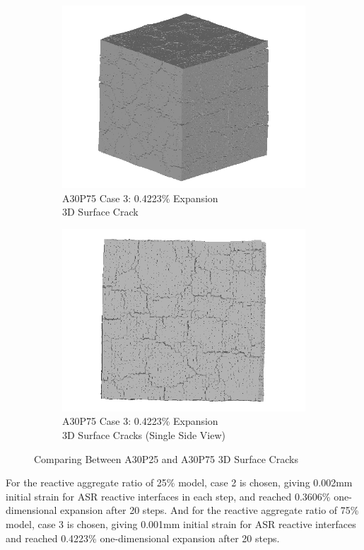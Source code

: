 \begin{figure}[ht!]
\begin{subfigure}{.5\textwidth}
    \end{subfigure}
    \begin{subfigure}{.5\textwidth}
      \centering
      \includegraphics[width=.8\linewidth]{Files/exp_3D/ASR/A30P75_3_3d.png}
    \caption{A30P75 Case 3: 0.4223\% Expansion\\ 3D Surface Crack}
    \end{subfigure}%
    \begin{subfigure}{.5\textwidth}
      \centering
      \includegraphics[width=.8\linewidth]{Files/exp_3D/ASR/A30P75_3_3ds.png}
    \caption{A30P75 Case 3: 0.4223\% Expansion\\ 3D Surface Cracks (Single Side View)}
    \end{subfigure}

  \caption{Comparing Between A30P25 and A30P75 3D Surface Cracks}
  \label{fig:ASR_A30P25vsA30P75_3D}
\end{figure}


For the reactive aggregate ratio of 25\% model, case 2 is chosen, giving 0.002mm initial strain for ASR reactive interfaces in each step, and reached 0.3606\% one-dimensional expansion after 20 steps. And for the reactive aggregate ratio of 75\% model, case 3 is chosen, giving 0.001mm initial strain for ASR reactive interfaces and reached 0.4223\% one-dimensional expansion after 20 steps.

